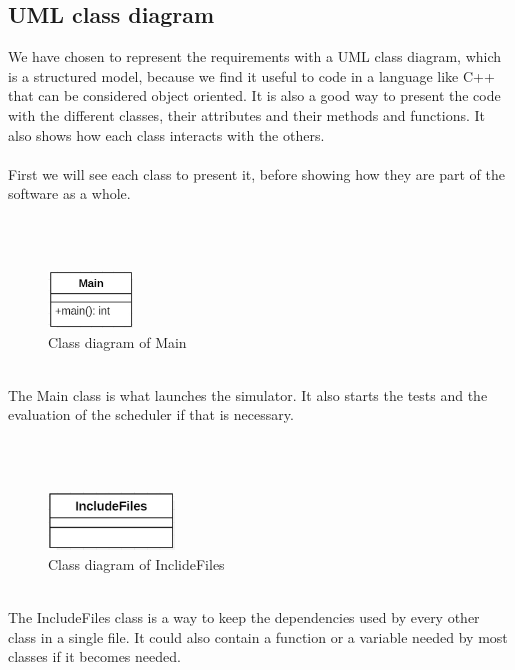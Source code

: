 \documentclass [10 pt, a4 paper]{report}
\begin{document}
\subsection{UML class diagram}
We have chosen to represent the requirements with a UML class diagram, which is a structured model, because we find it useful to code in a language like C++ that can be considered object oriented. It is also a good way to present the code with the different classes, their attributes and their methods and functions. It also shows how each class interacts with the others.
\\ \\
First we will see each class to present it, before showing how they are part of the software as a whole.

\\ \\

\begin{figure}[!htbp]
\centering
\includegraphics[width=0.2\textwidth]{Main.jpg}
\caption{\label{fig:image} Class diagram of Main}
\end{figure}
\\

\noindent
The Main class is what launches the simulator. It also starts the tests and the evaluation of the scheduler if that is necessary.


\\ \\

\begin{figure}[!htbp]
\centering
\includegraphics[width=0.3\textwidth]{IncludeFiles.jpg}
\caption{\label{fig:image} Class diagram of InclideFiles}
\end{figure}
\\

\noindent
The IncludeFiles class is a way to keep the dependencies used by every other class in a single file. It could also contain a function or a variable needed by most classes if it becomes needed.

\clearpage
\end{document}
